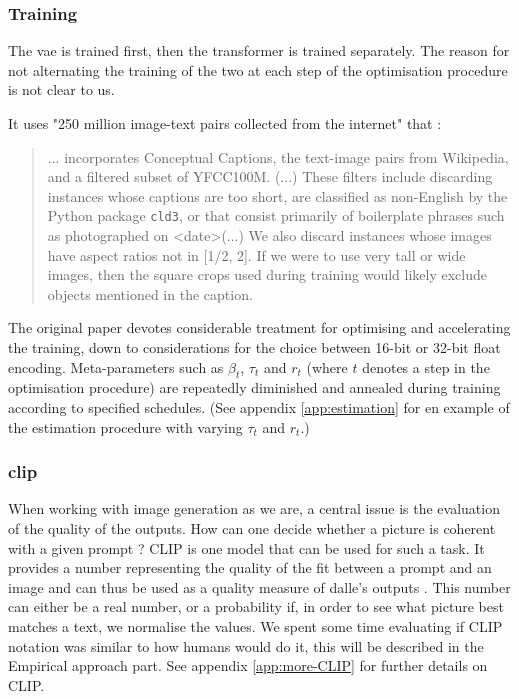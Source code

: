 \documentclass{article}
\begin{document}
\begin{multicols}{2}
\subsubsection{Training} \label{section:training}

The \gls{vae} is trained first, then the \gls{transformer} is trained separately. The reason for not alternating the training of the two at each step of the optimisation procedure is not clear to us.

It uses "250 million image-text pairs collected from the internet" that :
\blockquote{... incorporates Conceptual Captions, the text-image pairs from Wikipedia, and a filtered subset of YFCC100M. (...) These filters include discarding instances whose captions are too short, are classified as non-English by the Python package \texttt{cld3}, or that consist primarily of boilerplate phrases such as \og photographed on <date>\fg (...) We also discard instances whose images have aspect ratios not in [1/2, 2]. If we were to use very tall or wide images, then the square crops used during training would likely exclude objects mentioned in the caption.}

The original paper devotes considerable treatment for optimising and accelerating the training, down to considerations for the choice between 16-bit or 32-bit float encoding. Meta-parameters such as $\beta_t$, $\tau_t$ and $r_t$ (where $t$ denotes a step in the optimisation procedure) are repeatedly diminished and annealed during training according to specified schedules. (See appendix  \ref{app:estimation} for en example of the estimation procedure with varying $\tau_t$ and $r_t$.)

\subsubsection{\gls{clip}}

When working with image generation as we are, a central issue is the evaluation of the quality of the outputs. How can one decide whether a picture is coherent with a given prompt ? CLIP is one model that can be used for such a task. It provides a number representing the quality of the fit between a prompt and an image and can thus be used as a quality measure of \gls{dalle}'s outputs \citet{learntransf, openaiclip}. This number can either be a real number, or a probability if, in order to see what picture best matches a text, we normalise the values. We spent some time evaluating if CLIP notation was similar to how humans would do it, this will be described in the Empirical approach part. See appendix \ref{app:more-CLIP} for further details on CLIP. 


\end{multicols}
\end{document}
